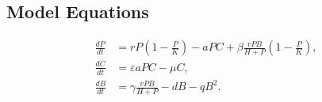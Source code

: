 \documentclass[11pt]{article}
\begin{document}
\subsection{Model Equations}
\begin{equation}
    \begin{aligned}
        \frac{dP}{dt} &= rP\left(1-\frac{P}{K}\right)-aPC
        +\beta\frac{vPB}{H+P}\left(1-\frac{P}{K}\right), \\
        \frac{dC}{dt} &= \varepsilon aPC-\mu C, \\
        \frac{dB}{dt} &= \gamma\frac{vPB}{H+P}-dB-qB^2.
    \end{aligned}
    \label{eq:stage2-model}
\end{equation}
\end{document}
